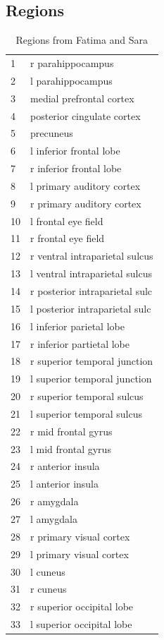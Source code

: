 \documentclass[11pt]{article}
\begin{document}
\subsection{Regions}
\begin{table}[H]
\begin{tabular}{ll}
1 & r parahippocampus\\
2 & l parahippocampus\\
3 & medial prefrontal cortex\\
4 & posterior cingulate cortex\\
5 & precuneus\\
6 & l inferior frontal lobe\\
7 & r inferior frontal lobe\\
8 & l primary auditory cortex\\
9 & r primary auditory cortex\\
10 & l frontal eye field\\
11 & r frontal eye field\\
12 & r ventral intraparietal sulcus\\
13 & l ventral intraparietal sulcus\\
14 & r posterior intraparietal sulc\\
15 & l posterior intraparietal sulc\\
16 & l inferior parietal lobe\\
17 & r inferior partietal lobe\\
18 & r superior temporal junction\\
19 & l superior temporal junction\\
20 & r superior temporal sulcus\\
21 & l superior temporal sulcus\\
22 & r mid frontal gyrus\\
23 & l mid frontal gyrus\\
24 & r anterior insula\\
25 & l anterior insula\\
26 & r amygdala\\
27 & l amygdala\\
28 & r primary visual cortex\\
29 & l primary visual cortex\\
30 & l cuneus\\
31 & r cuneus\\
32 & r superior occipital lobe\\
33 & l superior occipital lobe\\
\end{tabular}
\caption{Regions from Fatima and Sara}
\end{table}
\end{document}
